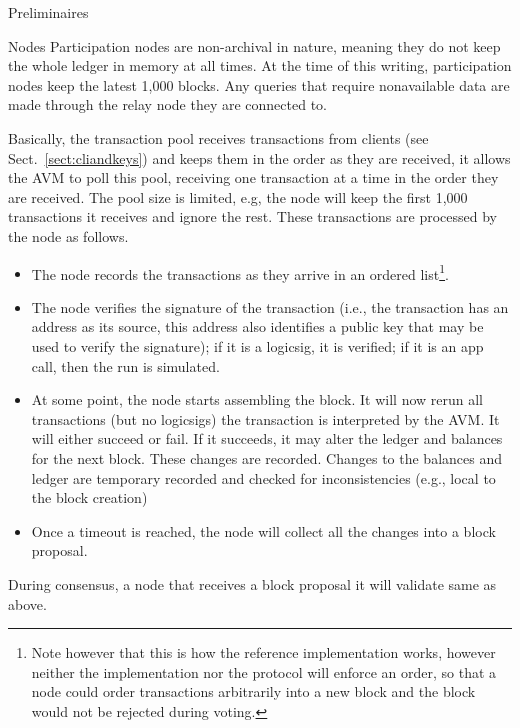 \documentclass[10pt,a4paper]{article}
\begin{document}
\begin{section}{Preliminaires}
\begin{subsection}{Nodes}
Participation nodes are non-archival in nature, meaning they do not keep
the whole ledger in memory at all times. 
At the time of this writing, participation nodes keep the latest 1,000 blocks.
Any queries that require nonavailable data are made through the relay node 
they are connected to.

Basically, the transaction pool receives transactions
from clients (see Sect.~\ref{sect:cliandkeys}) and keeps them in the order as they are 
received, it allows the AVM to poll this pool, receiving one transaction at a time in
the order they are received. 
The pool size is limited, e.g, the node will keep the first 1,000 transactions it receives 
and ignore the rest.
These transactions are processed by the node as follows.
\begin{itemize}
    \item The node records the transactions as they arrive in an ordered list\footnote{Note
        however that this is how the reference implementation works, however neither the implementation
        nor the protocol will enforce an order, so that a node could order transactions arbitrarily 
        into a new block and the block would not be rejected during voting.}.
    \item The node verifies the signature of the transaction (i.e., the transaction has an 
        address as its source, this address also identifies a public key that may be used to 
        verify the signature); if it is a logicsig, it is verified; if it is an app call, then
        the run is simulated.
    \item At some point, the node starts assembling the block. It will now rerun all transactions
        (but no logicsigs) the transaction is interpreted by the AVM. It will either succeed or
        fail. If it succeeds, it may alter the ledger and balances for the next block. These 
        changes are recorded. Changes to the balances and ledger are temporary recorded and
        checked for inconsistencies (e.g., local to the block creation)
    \item Once a timeout is reached, the node will collect all the changes into a block 
        proposal. 
\end{itemize}

During consensus, a node that receives a block proposal it will validate same as above.


\end{subsection}
\end{section}
\end{document}
